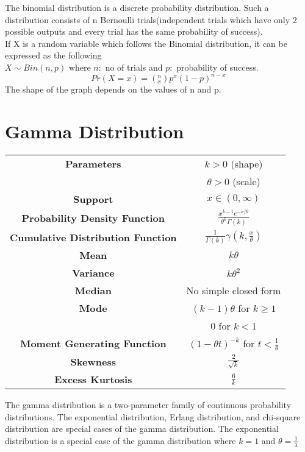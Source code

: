 \documentclass[14pt, a4paper]{article}
\theoremstyle{definition}
\begin{document}
  
  
The binomial distribution is a discrete probability distribution. Such a distribution consists of n Bernoulli trials(independent trials which have only 2 possible outputs and every trial has the same probability of success). 
\\ If X is a random variable which follows the Binomial distribution, it can be expressed as the following
\\ $X \sim Bin(n,p)$ where $n:$ no of trials and $p:$ probability of success. 
\[Pr(X=x) = (^n_x)p^x(1-p)^{n-x}\]
The shape of the graph depends on the values of n and p.


\section{Gamma Distribution}

\begin{center}
    \begin{tabular}{|c|c|}  %
\hline
 \textbf{Parameters }&  $k > 0$ (shape) \\ & $\theta > 0$ (scale)\\
 \hline
 \textbf{Support} &  $x \in (0, \infty) $\\
 \hline
 \textbf{Probability Density Function} &  $\frac{x^{k-1}e^{-x/\theta}}{\theta^k \Gamma(k)}$ \\
 \hline
 \textbf{Cumulative Distribution Function} & $\frac{1}{\Gamma(k)} \gamma(k, \frac{x}{\theta} )$ \\
 \hline
 \textbf{Mean} & $k \theta$ \\ 
 \hline
 \textbf{Variance} & $k \theta^2$ \\
 \hline
 \textbf{Median} &  No simple closed form \\ 
 \hline
 \textbf{Mode} & $(k-1)\theta$ for $k \geq 1$ \\ & $0$ for $k < 1$ \\
 \hline
 \textbf{Moment Generating Function} & $(1 - \theta t)^{-k} $ for $t < \frac{1}{\theta}$\\
 \hline
 \textbf{Skewness} & $\frac{2}{\sqrt{k}}$ \\
 \hline
 \textbf{Excess Kurtosis} & $\frac{6}{k}$  \\
 \hline
       
  \end{tabular}
\end{center}

 
The gamma distribution is a two-parameter family of continuous probability distributions. The exponential distribution, Erlang distribution, and chi-square distribution are special cases of the gamma distribution. The exponential distribution is a special case of the gamma distribution where $k = 1$ and $\theta = \frac{1}{\lambda}$
  
\end{document}
